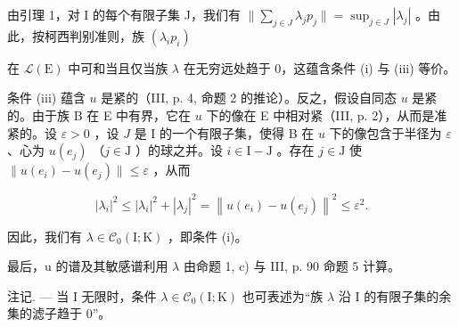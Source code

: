 由引理 1，对 I 的每个有限子集 J，我们有 \(\| \sum_{j\in J}\lambda_jp_j\| = \sup_{j\in J}|\lambda_j|\) 。由此，按柯西判别准则，族 \((\lambda_ip_i)\)

在 \(\mathcal{L}(\mathrm{E})\) 中可和当且仅当族 \(\lambda\) 在无穷远处趋于 0，这蕴含条件 (i) 与 (iii) 等价。

条件 (iii) 蕴含 \(u\) 是紧的（III, p. 4, 命题 2 的推论）。反之，假设自同态 \(u\) 是紧的。由于族 B 在 E 中有界，它在 \(u\) 下的像在 E 中相对紧（III, p. 2），从而是准紧的。设 \(\varepsilon > 0\) ，设 \(J\) 是 I 的一个有限子集，使得 B 在 \(u\) 下的像包含于半径为 \(\varepsilon\) 、心为 \(u(e_j)\) （\(j \in \mathrm{J}\) ）的球之并。设 \(i \in \mathrm{I} - \mathrm{J}\) 。存在 \(j \in \mathrm{J}\) 使 \(\| u(e_i) - u(e_j) \| \leqslant \varepsilon\) ，从而

\[
\left| \lambda_ {i} \right| ^ {2} \leqslant \left| \lambda_ {i} \right| ^ {2} + \left| \lambda_ {j} \right| ^ {2} = \left\| u \left(e _ {i}\right) - u \left(e _ {j}\right) \right\| ^ {2} \leqslant \varepsilon^ {2}.
\]

因此，我们有 \(\lambda \in \mathcal{C}_0(\mathrm{I};\mathrm{K})\) ，即条件 (i)。

最后，u 的谱及其敏感谱利用 \(\lambda\) 由命题 1, c) 与 III, p. 90 命题 5 计算。

注记. --- 当 I 无限时，条件 \(\lambda\in\mathcal{C}_{0}(\mathrm{I};\mathrm{K})\) 也可表述为“族 \(\lambda\) 沿 I 的有限子集的余集的滤子趋于 0”。

